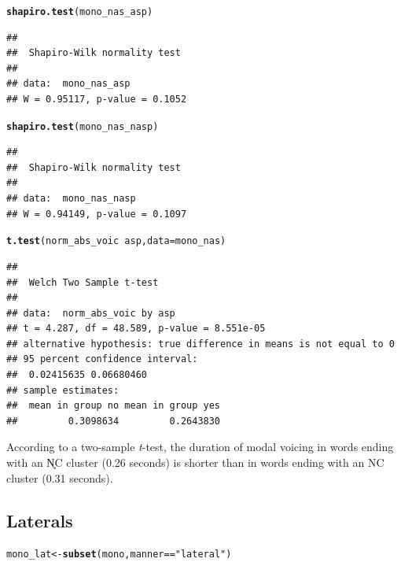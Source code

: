 \documentclass[a4paper,11pt]{article}\usepackage[]{graphicx}\usepackage[]{color}
\makeatletter
\newcommand{\hlstr}[1]{\textcolor[rgb]{0.192,0.494,0.8}{#1}}%
\newcommand{\hlopt}[1]{\textcolor[rgb]{0,0,0}{#1}}%
\newcommand{\hlstd}[1]{\textcolor[rgb]{0.345,0.345,0.345}{#1}}%
\newcommand{\hlkwb}[1]{\textcolor[rgb]{0.69,0.353,0.396}{#1}}%
\newcommand{\hlkwc}[1]{\textcolor[rgb]{0.333,0.667,0.333}{#1}}%
\newcommand{\hlkwd}[1]{\textcolor[rgb]{0.737,0.353,0.396}{\textbf{#1}}}%
\newenvironment{kframe}{%
 \def\at@end@of@kframe{}%
 \ifinner\ifhmode%
  \def\at@end@of@kframe{\end{minipage}}%
  \begin{minipage}{\columnwidth}%
 \fi\fi%
 \def\FrameCommand##1{\hskip\@totalleftmargin \hskip-\fboxsep
 \colorbox{shadecolor}{##1}\hskip-\fboxsep
     \hskip-\linewidth \hskip-\@totalleftmargin \hskip\columnwidth}%
 \MakeFramed {\advance\hsize-\width
   \@totalleftmargin\z@ \linewidth\hsize
   \@setminipage}}%
 {\par\unskip\endMakeFramed%
 \at@end@of@kframe}
\newenvironment{knitrout}{}{} %
\makeatother
\begin{document}
\begin{knitrout}
\color{fgcolor}\begin{kframe}
\begin{alltt}
\hlkwd{shapiro.test}\hlstd{(mono_nas_asp)}
\end{alltt}
\begin{verbatim}
## 
## 	Shapiro-Wilk normality test
## 
## data:  mono_nas_asp
## W = 0.95117, p-value = 0.1052
\end{verbatim}
\begin{alltt}
\hlkwd{shapiro.test}\hlstd{(mono_nas_nasp)}
\end{alltt}
\begin{verbatim}
## 
## 	Shapiro-Wilk normality test
## 
## data:  mono_nas_nasp
## W = 0.94149, p-value = 0.1097
\end{verbatim}
\begin{alltt}
\hlkwd{t.test}\hlstd{(norm_abs_voic} \hlopt{~} \hlstd{asp,} \hlkwc{data} \hlstd{= mono_nas)}
\end{alltt}
\begin{verbatim}
## 
## 	Welch Two Sample t-test
## 
## data:  norm_abs_voic by asp
## t = 4.287, df = 48.589, p-value = 8.551e-05
## alternative hypothesis: true difference in means is not equal to 0
## 95 percent confidence interval:
##  0.02415635 0.06680460
## sample estimates:
##  mean in group no mean in group yes 
##         0.3098634         0.2643830
\end{verbatim}
\end{kframe}
\end{knitrout}

According to a two-sample \textit{t}-test, the duration of modal voicing in words ending with an N̥C cluster (0.26 seconds) is shorter than in words ending with an NC cluster (0.31 seconds).

\subsection{Laterals}

\begin{knitrout}
\color{fgcolor}\begin{kframe}
\begin{alltt}
\hlstd{mono_lat} \hlkwb{<-} \hlkwd{subset}\hlstd{(mono, manner} \hlopt{==} \hlstr{"lateral"}\hlstd{)}
\end{alltt}
\end{kframe}
\end{knitrout}
\end{document}
